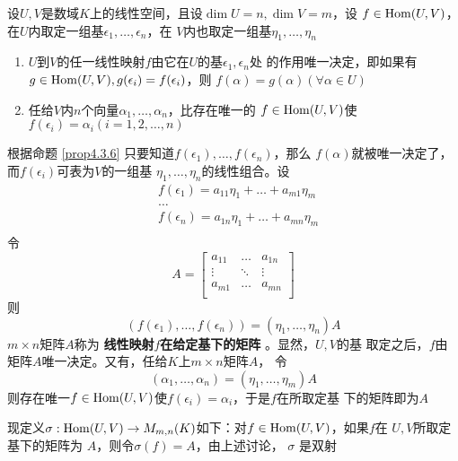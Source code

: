 \documentclass[11pt]{article}
\begin{document}
设\(U,V\)是数域\(K\)上的线性空间，且设\(\dim U=n,\dim V=m\)，设
\(f\in\operatorname{Hom}(U,V)\)，在\(U\)内取定一组基\(\epsilon_1,\dots,\epsilon_n\)，在
\(V\)内也取定一组基\(\eta_1,\dots,\eta_n\)

\begin{proposition}[]
\label{prop4.3.6}
\begin{enumerate}
\item \(U\)到\(V\)的任一线性映射\(f\)由它在\(U\)的基\(\epsilon_1,\epsilon_n\)处
的作用唯一决定，即如果有\(g\in\operatorname{Hom}(U,V),g(\epsilon_i)=f(\epsilon_i)\)，则
\(f(\alpha)=g(\alpha)(\forall\alpha\in U)\)
\item 任给\(V\)内\(n\)个向量\(\alpha_1,\dots,\alpha_n\)，比存在唯一的
\(f\in\operatorname{Hom}(U,V)\)使\(f(\epsilon_i)=\alpha_i(i=1,2,\dots,n)\)
\end{enumerate}
\end{proposition}

根据命题 \ref{prop4.3.6} 只要知道\(f(\epsilon_1),\dots,f(\epsilon_n)\)，那么
\(f(\alpha)\)就被唯一决定了，而\(f(\epsilon_i)\)可表为\(V\)的一组基
\(\eta_1,\dots,\eta_n\)的线性组合。设
\begin{align*}
&f(\epsilon_1)=a_{11}\eta_1+\dots+a_{m1}\eta_m\\
&\dots\\
&f(\epsilon_n)=a_{1n}\eta_1+\dots+a_{mn}\eta_m\\
\end{align*}
令
\begin{equation*}
A=
\begin{bmatrix}
a_{11}&\dots&a_{1n}\\
\vdots&\ddots&\vdots\\
a_{m1}&\dots&a_{mn}\\
\end{bmatrix}
\end{equation*}
则
\begin{equation*}
(f(\epsilon_1),\dots,f(\epsilon_n))=(\eta_1,\dots,\eta_n)A
\end{equation*}
\(m\times n\)矩阵\(A\)称为 \textbf{线性映射\(f\)在给定基下的矩阵} 。显然，\(U,V\)的基
取定之后，\(f\)由矩阵\(A\)唯一决定。又有，任给\(K\)上\(m\times n\)矩阵\(A\)，
令
\begin{equation*}
(\alpha_1,\dots,\alpha_n)=(\eta_1,\dots,\eta_m)A
\end{equation*}
则存在唯一\(f\in\operatorname{Hom}(U,V)\)使\(f(\epsilon_i)=\alpha_i\)，于是\(f\)在所取定基
下的矩阵即为\(A\)

现定义\(\sigma:\operatorname{Hom}(U,V)\to M_{m,n}(K)\)如下：对\(f\in\operatorname{Hom}(U,V)\)，如果\(f\)在
\(U,V\)所取定基下的矩阵为 \(A\)，则令\(\sigma(f)=A\)，由上述讨论， \(\sigma\) 是双射
\end{document}
